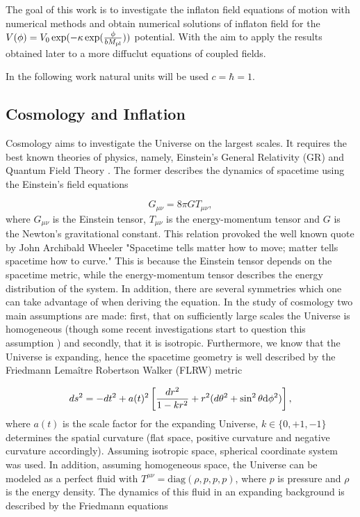 The goal of this work is to investigate the inflaton field equations of motion with numerical methods and obtain numerical solutions of inflaton field for the $V(\phi) = V_0 \exp ( - \kappa \exp(\frac{\phi}{b M_{\rm pl}})) $ potential. With the aim to apply the results obtained later to a more diffuclut equations of coupled fields.

In the following work natural units will be used $c=\hbar=1$.

\subsection{Cosmology and Inflation}

Cosmology aims to investigate the Universe on the largest scales. It requires the best known theories of physics, namely, Einstein's General Relativity (GR) \cite{carroll2019spacetime} and Quantum Field Theory \cite{zee2010quantum}. The former describes the dynamics of spacetime using the Einstein's field equations

\begin{equation}\label{eq: einsteins field equations}
    G_{\mu \nu} = 8 \pi G T_{\mu \nu},
\end{equation}
where $G_{\mu \nu}$ is the Einstein tensor, $T_{\mu \nu}$ is the energy-momentum tensor and $G$ is the Newton's gravitational constant. This relation provoked the well known quote by John Archibald Wheeler "Spacetime tells matter how to move; matter tells spacetime how to curve." This is because the Einstein tensor depends on the spacetime metric, while the energy-momentum tensor describes the energy distribution of the system. In addition, there are several symmetries which one can take advantage of when deriving the equation. In the study of cosmology two main assumptions are made: first, that on sufficiently large scales the Universe is homogeneous (though some recent investigations start to question this assumption \cite{simpson2025beyond}) and secondly, that it is isotropic. Furthermore, we know that the Universe is expanding, hence the spacetime geometry is well described by the Friedmann Lemaître Robertson Walker (FLRW) metric \cite{friedmann1922125}

\begin{equation}
    ds^2 = - dt^2 + a(t)^2 \left[ \frac{dr^2}{1-kr^2} + r^2 (d \theta^2 + \sin^2 \theta \mathrm{d} \phi^2) \right],
\end{equation}
where $a(t)$ is the scale factor for the expanding Universe, $k \in \{ 0, +1, -1 \}$ determines the spatial curvature (flat space, positive curvature and negative curvature accordingly). Assuming isotropic space, spherical coordinate system was used. In addition, assuming homogeneous space, the Universe can be modeled as a perfect fluid with $T^{\mu \nu} = \mathrm{diag}(\rho, p, p,p)$, where  $p$ is pressure and $\rho$ is the energy density. The dynamics of this fluid in an expanding background is described by the Friedmann equations

